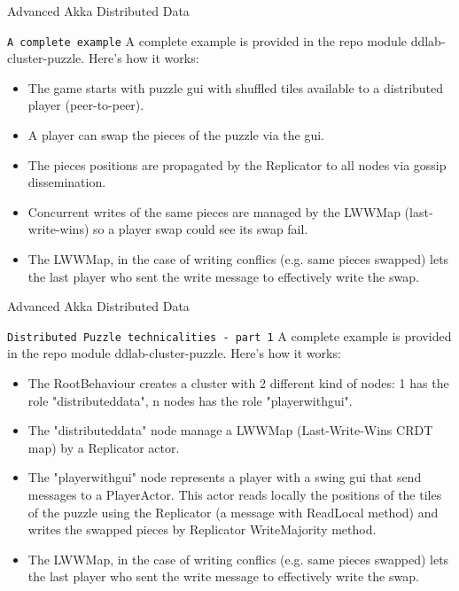\documentclass[presentation,apice]{beamer}\mode<presentation>{\usetheme{AMSBolognaFC}}
\begin{document}
\begin{frame}[c,fragile]{Advanced Akka Distributed Data}
\begin{block}{\texttt{A complete example}}
A complete example is provided in the repo module ddlab-cluster-puzzle. Here's how it works:
\begin{itemize}
    \item The game starts with puzzle gui with shuffled tiles available to a distributed player (peer-to-peer).
    \item A player can swap the pieces of the puzzle via the gui.
    \item The pieces positions are propagated by the Replicator to all nodes via gossip dissemination.
    \item Concurrent writes of the same pieces are managed by the LWWMap (last-write-wins) so a player swap could see its swap fail.
    \item The LWWMap, in the case of writing conflics (e.g. same pieces swapped) lets the last player who sent the write message to effectively write the swap.
\end{itemize}
\end{block}
\end{frame}

\begin{frame}[c,fragile]{Advanced Akka Distributed Data}
\begin{block}{\texttt{Distributed Puzzle technicalities - part 1}}
A complete example is provided in the repo module ddlab-cluster-puzzle. Here's how it works:
\begin{itemize}
    \item The RootBehaviour creates a cluster with 2 different kind of nodes: 1 has the role "distributeddata", n nodes has the role "playerwithgui".
    \item The "distributeddata" node manage a LWWMap (Last-Write-Wins CRDT map) by a Replicator actor.
    \item The "playerwithgui" node represents a player with a swing gui that send messages to a PlayerActor. This actor reads locally the positions of the tiles of the puzzle using the Replicator (a message with ReadLocal method) and writes the swapped pieces by Replicator WriteMajority method.
    \item The LWWMap, in the case of writing conflics (e.g. same pieces swapped) lets the last player who sent the write message to effectively write the swap.
\end{itemize}
\end{block}
\end{frame}
\end{document}
